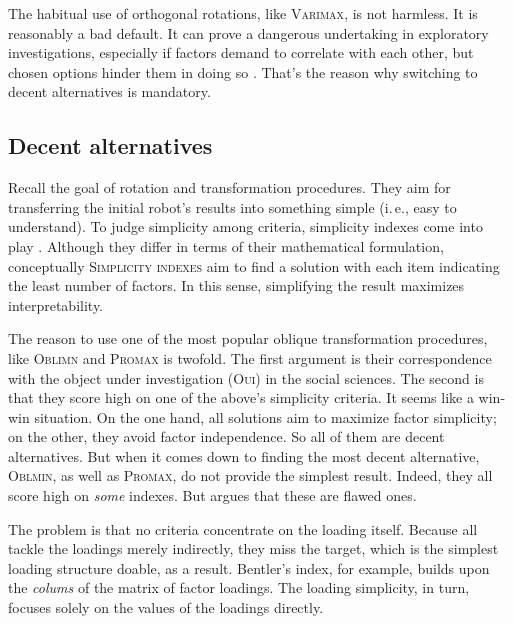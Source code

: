 \documentclass[jou, 11pt]{apa7}
\begin{document}
The habitual use of orthogonal rotations, like \textsc{Varimax}, is not
harmless. It is reasonably a bad default. It can prove a dangerous undertaking
in exploratory investigations, especially if factors demand to correlate with
each other, but chosen options hinder them in doing so \parencite{Loo1979}.
That’s the reason why switching to decent alternatives is mandatory.

\subsection{Decent alternatives}

Recall the goal of rotation and transformation procedures. They aim for
transferring the initial robot's results into something simple (i.\,e., easy to
understand). To judge simplicity among criteria, simplicity indexes come into
play \parencite[see, e.\,g.][]{Bentler1977, Kaiser1974, Lorenzo-Seva2003}.
Although they differ in terms of their mathematical formulation, conceptually
\textsc{Simplicity indexes} aim to find a solution with each item indicating
the least number of factors. In this sense, simplifying the result maximizes
interpretability.

The reason to use one of the most popular oblique transformation procedures,
like \textsc{Oblimn} and \textsc{Promax} \parencite{Hendrickson1964} is
twofold. The first argument is their correspondence with the object under
investigation (\textsc{Oui}) in the social sciences. The second is that they score high
on one of the above's simplicity criteria. It seems like a win-win situation.
On the one hand, all solutions aim to maximize factor simplicity; on the other,
they avoid factor independence. So all of them are decent alternatives. But
when it comes down to finding the most decent alternative, \textsc{Oblmin}, as
well as \textsc{Promax}, do not provide the simplest result. Indeed, they all
score high on \textit{some} indexes. But \textcite{Lorenzo-Seva2003} argues
that these are flawed ones. 

The problem is that no criteria concentrate on the loading itself. Because all
tackle the loadings merely indirectly, they miss the target, which is the
simplest loading structure doable, as a result. Bentler’s index, for example,
builds upon the \textit{colums} of the matrix of factor loadings. The loading
simplicity, in turn, focuses solely on the values of the loadings directly.
\end{document}
